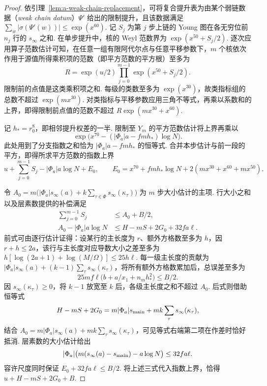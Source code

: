\begin{proof}
依引理~\ref{lem:a-weak-chain-replacement}，可将复合提升表为由某个弱链数据（\emph{weak chain datum}）$\Psi'$ 给出的限制提升，且该数据满足 $\sum_w|\sigma(\Psi'(w))|\le\exp(x^{60})$. 记 $S_j$ 为第 $j$ 步上链的 Young 图在各无穷位前 $n_j$ 行的 $s_\infty$ 之和. 在单步提升中，核的 Weyl 范数界为 $\exp(x^{50}+S_j/2)$. 逐次应用算子范数估计可知，在任意一组有限阿代尔点与任意平移参数下，$m$ 个核依次作用于源值所得乘积项的范数（即平方范数的平方根）至多为
\[
 R=\exp(u/2)\prod_{j=0}^{m-1}\exp(x^{50}+S_j/2).
\]
限制前的点值是这类乘积项之和. 每级的类数至多为 $\exp(x^{30})$，故类指标组的总数不超过 $\exp(mx^{30})$. 对类指标与平移参数应用三角不等式，再乘以系数和的上界，即得限制前点值的范数不超过 $R\exp(mx^{30}+x^{60})$.

记 $h_*=r_0^8$，即相邻提升权差的一半. 限制至 $Y_m$ 的平方范数估计将上界再乘以
\[
 \exp\bigl(x^{70}-(|\Phi_a|a-fmh_*)\log N\bigr).
\]
此处用到了分支指数之和恰为 $|\Phi_a|a-fmh_*$ 的恒等式. 合并本步估计与前一段的平方，即得所求平方范数的指数上界
\[
 u+\sum_{j=0}^{m-1} S_j- |\Phi_a|a\log N+E_0,
 \qquad
 E_0=x^{70}+fmh_*\log N+2(mx^{30}+x^{60}+mx^{50}).
\]

令 $A_0=m\bigl(|\Phi_a|s_\infty(a)+k\sum_{\tau\in\Phi}s_\infty(\kappa_\tau)\bigr)$ 为 $m$ 步大小估计的主项. 行大小之和以及层素数提供的补偿满足
\[
 \begin{aligned}
 \sum_{j=0}^{m-1} S_j&\le A_0+B/2,\\
 A_0-|\Phi_a|a\log N&\le H-mS+2G_0+32fa\ell .
 \end{aligned}
\]
前式可由逐行估计证得：设某行的主长度为 $r$、额外方格数至多为 $h$，因 $r+h\le2a$，该行与主长度对应导数大小之差至多为
$h[\log(2a+1)+\log(M/\Omega)]\le25h\ell$. 每一级主长度的贡献为 $|\Phi_a|s_\infty(a)+(k-1)\sum_\tau s_\infty(\kappa_\tau)$，将所有额外方格数累加后，总误差至多为
\[
 25mf\ell\bigl(b+a/x_1+n_mh_*^2\bigr)\le B/2 .
\]
因 $s_\infty(\kappa_\tau)\ge0$，将 $k-1$ 放宽至 $k$ 后，各级主长度之和不超过 $A_0$. 后式则借助恒等式
\[
 H-mS+2G_0
 =m|\Phi_a|s_{\rm main}
   +mk\sum_{\tau}s_\infty(\kappa_\tau),
\]
结合 $A_0=m|\Phi_a|s_\infty(a)+mk\sum_\tau s_\infty(\kappa_\tau)$，可见等式右端第二项在作差时恰好抵消. 层素数的大小估计给出
\[
 |\Phi_a|\bigl(m(s_\infty(a)-s_{\rm main})-a\log N\bigr)\le32fa\ell .
\]
容许尺度同时保证 $E_0+32fa\ell\le B/2$. 将上述三式代入指数上界，恰得 $u+H-mS+2G_0+B$.
\end{proof}


